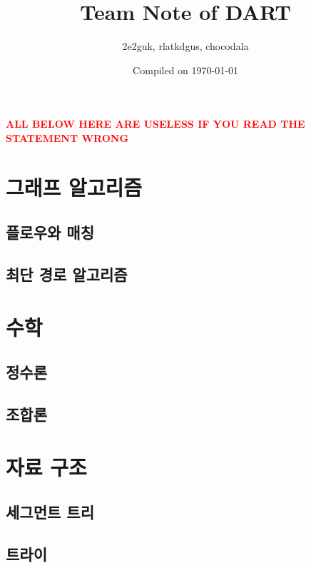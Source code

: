\documentclass[landscape, 8pt, a4paper, oneside, twocolumn]{extarticle}
\title{Team Note of DART}
\author{2e2guk, rlatkdgus, chocodala}
\date{Compiled on \today}
\begin{document}
{
    \Large

    \maketitle

    \tableofcontents
}
\thispagestyle{fancy}
\pagebreak

\textcolor{red}{\textbf{ALL BELOW HERE ARE USELESS IF YOU READ THE STATEMENT WRONG}}


\section{그래프 알고리즘}

\subsection{플로우와 매칭}


\subsection{최단 경로 알고리즘}


\section{수학}

\subsection{정수론}


\subsection{조합론}


\section{자료 구조}

\subsection{세그먼트 트리}


\subsection{트라이}

\end{document}
